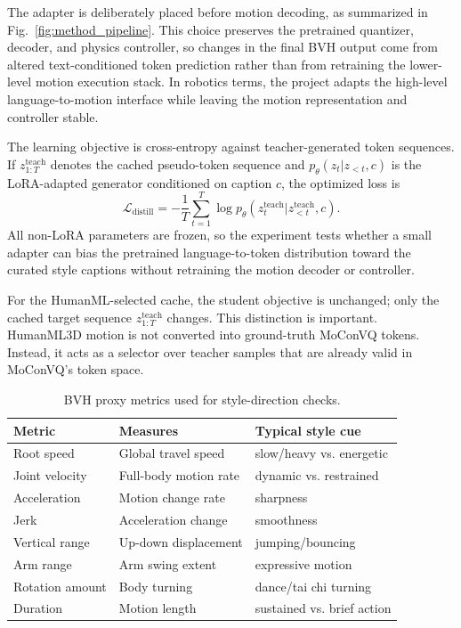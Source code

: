 \documentclass[conference]{IEEEtran}
\begin{document}
The adapter is deliberately placed before motion decoding, as summarized in Fig.~\ref{fig:method_pipeline}. This choice preserves the pretrained quantizer, decoder, and physics controller, so changes in the final BVH output come from altered text-conditioned token prediction rather than from retraining the lower-level motion execution stack. In robotics terms, the project adapts the high-level language-to-motion interface while leaving the motion representation and controller stable.

The learning objective is cross-entropy against teacher-generated token sequences. If $z_{1:T}^{\mathrm{teach}}$ denotes the cached pseudo-token sequence and $p_\theta(z_t|z_{<t}, c)$ is the LoRA-adapted generator conditioned on caption $c$, the optimized loss is
\begin{equation}
\mathcal{L}_{\mathrm{distill}} = - \frac{1}{T}\sum_{t=1}^{T} \log p_\theta(z_t^{\mathrm{teach}}|z_{<t}^{\mathrm{teach}}, c).
\end{equation}
All non-LoRA parameters are frozen, so the experiment tests whether a small adapter can bias the pretrained language-to-token distribution toward the curated style captions without retraining the motion decoder or controller.

For the HumanML-selected cache, the student objective is unchanged; only the cached target sequence $z_{1:T}^{\mathrm{teach}}$ changes. This distinction is important. HumanML3D motion is not converted into ground-truth MoConVQ tokens. Instead, it acts as a selector over teacher samples that are already valid in MoConVQ's token space.

\begin{table}[!t]
\centering
\caption{BVH proxy metrics used for style-direction checks.}
\footnotesize
\begin{tabular}{lll}
\hline
Metric & Measures & Typical style cue \\
\hline
Root speed & Global travel speed & slow/heavy vs. energetic \\
Joint velocity & Full-body motion rate & dynamic vs. restrained \\
Acceleration & Motion change rate & sharpness \\
Jerk & Acceleration change & smoothness \\
Vertical range & Up-down displacement & jumping/bouncing \\
Arm range & Arm swing extent & expressive motion \\
Rotation amount & Body turning & dance/tai chi turning \\
Duration & Motion length & sustained vs. brief action \\
\hline
\end{tabular}
\label{tab:proxy_definitions}
\end{table}
\end{document}
